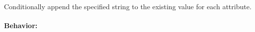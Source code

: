 Conditionally append the specified string to the existing value for each
attribute.

\paragraph{Behavior:}
\begin{itemize}[noitemsep]


\end{itemize}
